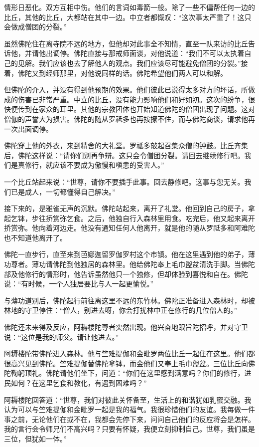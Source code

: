 \documentclass[12pt,twoside,openany]{book}
\begin{document}
情形日恶化。双方互相中伤。他们的言词如毒箭一般。除了一些不偏帮任何一边的比丘，其他的比丘，大都站在其中一边。中立者都慨叹：“这次事太严重了！这只会做成僧团的分裂。”

虽然佛陀住在离寺院不远的地方，但他却对此事全不知情，直至一队来访的比丘告诉他，并请他出调停。佛陀直接与那戒师面谈，对他说道：“我们不可以太执着自己的见解。我们应该也去了解他人的观点。我们应该尽可能避免僧团的分裂。”接着，佛陀又到经师那里，对他说同样的话。佛陀希望他们两人可以和解。

但佛陀的介入，并没有得到他预期的效果。他们彼此已说得太多对方的坏话，所做成的伤害已非常严重。中立的比丘，没有能力影响他们和好如初。这次的纷争，很快便传到在家众的耳里。其他的宗教团体也开始知道佛陀的僧团出现了问题。这对僧伽的声誉大为损害。佛陀的随从罗祗多也再按撩不住，而与佛陀商谈，请求他再一次出面调停。

佛陀穿上他的外衣，来到精舍的大礼堂。罗祗多敲起召集众僧的钟鼓。比丘齐集后，佛陀这样说：“请你们别再争辩。这只会令僧团分裂。请回去继续修行吧。我们是真修行，就应该不要成为傲慢和嗔恚的受害人。”

一个比丘站起来说：“世尊，请你不要插手此事。回去静修吧。这事与您无关。我们已是成人，一切都懂得自己解决。”

接下来的，是雅雀无声的沉默。佛陀站起来，离开了礼堂。他回到自己的房子，拿起乞钵，步往挢赏弥乞食。之后，他独自行入森林里用食。吃完后，他又起来离开挢赏弥。他向着河边走。他没有通知任何人他离开，就是他的随从罗祗多和阿难陀也不知道他离开了。

佛陀一直步行，直至来到芭娜迦留罗伽罗村这个市镇。他在这里遇到他的弟子，薄功尊者。薄功请佛陀到他独居的森林里。他给佛陀奉上毛巾盥盆清洗手脚。当佛陀部及他修行的情形时，他告诉虽然他只一个独修，但却体验到喜悦和自在。佛陀说：“有时候，一个人独居要比与人一起更愉悦。”

与薄功道别后，佛陀起行前往离这里不远的东竹林。佛陀正准备进入森林时，却被林地的守卫停住：“僧人，别进去呀，你会打扰林中正在修行的几位僧人的。”

佛陀还未来得及反应，阿耨楼陀尊者突然出现。他兴奋地跟旨陀招呼，并对守卫说：“这位是我的师父。请让他进去。”

阿耨楼陀带佛陀进入森林。他与竺难提伽和金毗罗两位比丘一起住在这里。他们都很高兴见到佛陀。竺难提伽替佛陀拿钵，而金他们又奉上毛巾盥盆。三位比丘向佛陀鞠躬顶礼。佛陀请他们坐下，问道：“你们在这里感到满意吗？你们的修行，进民如何？在这里乞食和教化，有遇到困难吗？”

阿耨楼陀回答道：“世尊，我们对彼此关怀备至，生活上的和谐犹如乳蜜交融。我认为可以与竺难提伽和金毗罗一起是我的福气。我很珍惜他们的友谊。我每做一件事之前，无论他们在或不在，我都会先停下来，问问自己他们的反应将会是怎样。我的言行会令师兄们不高兴吗？只要有怀疑，我便立刻抑制自己。世尊，我们虽是三位，但犹如一体。”
\end{document}
